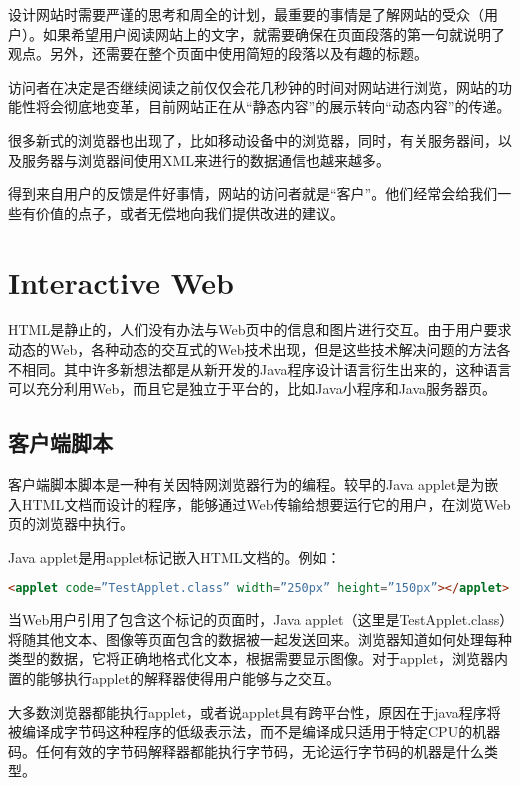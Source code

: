 设计网站时需要严谨的思考和周全的计划，最重要的事情是了解网站的受众（用户）。如果希望用户阅读网站上的文字，就需要确保在页面段落的第一句就说明了观点。另外，还需要在整个页面中使用简短的段落以及有趣的标题。



访问者在决定是否继续阅读之前仅仅会花几秒钟的时间对网站进行浏览，网站的功能性将会彻底地变革，目前网站正在从“静态内容”的展示转向“动态内容”的传递。

很多新式的浏览器也出现了，比如移动设备中的浏览器，同时，有关服务器间，以及服务器与浏览器间使用XML来进行的数据通信也越来越多。

得到来自用户的反馈是件好事情，网站的访问者就是“客户”。他们经常会给我们一些有价值的点子，或者无偿地向我们提供改进的建议。


\chapter{Interactive Web}


HTML是静止的，人们没有办法与Web页中的信息和图片进行交互。由于用户要求动态的Web，各种动态的交互式的Web技术出现，但是这些技术解决问题的方法各不相同。其中许多新想法都是从新开发的Java程序设计语言衍生出来的，这种语言可以充分利用Web，而且它是独立于平台的，比如Java小程序和Java服务器页。


\section{客户端脚本}

客户端脚本脚本是一种有关因特网浏览器行为的编程。较早的Java applet是为嵌入HTML文档而设计的程序，能够通过Web传输给想要运行它的用户，在浏览Web页的浏览器中执行。


Java applet是用applet标记嵌入HTML文档的。例如：

\begin{lstlisting}[language=HTML]
<applet code=”TestApplet.class” width=”250px” height=”150px”></applet>
\end{lstlisting}

当Web用户引用了包含这个标记的页面时，Java applet（这里是TestApplet.class）将随其他文本、图像等页面包含的数据被一起发送回来。浏览器知道如何处理每种类型的数据，它将正确地格式化文本，根据需要显示图像。对于applet，浏览器内置的能够执行applet的解释器使得用户能够与之交互。

大多数浏览器都能执行applet，或者说applet具有跨平台性，原因在于java程序将被编译成字节码这种程序的低级表示法，而不是编译成只适用于特定CPU的机器码。任何有效的字节码解释器都能执行字节码，无论运行字节码的机器是什么类型。

